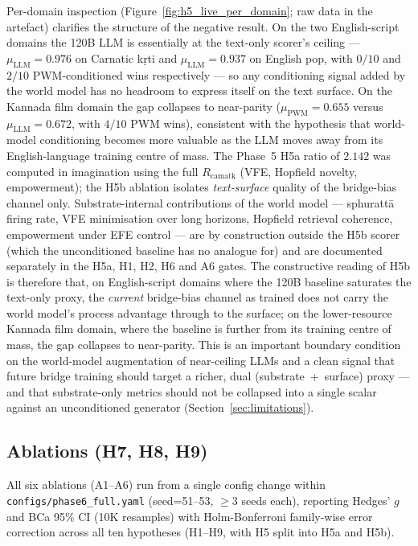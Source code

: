 \documentclass[journal,onecolumn,11pt]{IEEEtran}
\begin{document}
Per-domain inspection (Figure~\ref{fig:h5_live_per_domain}; raw data in the
 artefact) clarifies the
structure of the negative result.
On the two English-script domains the 120B LLM is essentially at the
text-only scorer's ceiling --- $\mu_{\text{LLM}} = 0.976$ on Carnatic kṛti
and $\mu_{\text{LLM}} = 0.937$ on English pop, with $0/10$ and $2/10$
PWM-conditioned wins respectively --- so any conditioning signal added by
the world model has no headroom to express itself on the text surface.
On the Kannada film domain the gap collapses to near-parity
($\mu_{\text{PWM}} = 0.655$ versus $\mu_{\text{LLM}} = 0.672$, with $4/10$
PWM wins), consistent with the hypothesis that world-model conditioning
becomes more valuable as the LLM moves away from its English-language
training centre of mass.
The Phase~5 H5a ratio of $2.142$ was computed in imagination using the
full $R_{\text{camatk}}$ (VFE, Hopfield novelty, empowerment); the H5b
ablation isolates \emph{text-surface} quality of the bridge-bias channel
only.
Substrate-internal contributions of the world model --- sphurattā firing
rate, VFE minimisation over long horizons, Hopfield retrieval coherence,
empowerment under EFE control --- are by construction outside the H5b
scorer (which the unconditioned baseline has no analogue for) and are
documented separately in the H5a, H1, H2, H6 and A6 gates.
The constructive reading of H5b is therefore that, on English-script
domains where the 120B baseline saturates the text-only proxy, the
\emph{current} bridge-bias channel as trained does not carry the world
model's process advantage through to the surface; on the lower-resource
Kannada film domain, where the baseline is further from its training
centre of mass, the gap collapses to near-parity.
This is an important boundary condition on the world-model augmentation
of near-ceiling LLMs and a clean signal that future bridge training should
target a richer, dual (substrate~+~surface) proxy --- and that
substrate-only metrics should not be collapsed into a single scalar
against an unconditioned generator (Section~\ref{sec:limitations}).

\subsection{Ablations (H7, H8, H9)}

All six ablations (A1--A6) run from a single config change within
\texttt{configs/phase6\_full.yaml} (seed=51--53, $\geq 3$ seeds each),
reporting Hedges' $g$ and BCa 95\% CI (10K resamples) with Holm-Bonferroni
family-wise error correction across all ten hypotheses (H1--H9, with H5
split into H5a and H5b).
\end{document}
